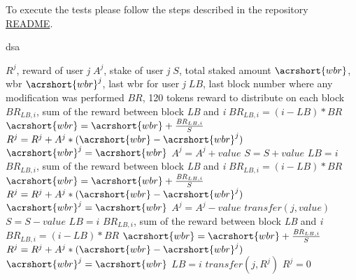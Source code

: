\documentclass[a4paper]{article}
\begin{document}
\noindent To execute the tests please follow the steps described in the repository \href{https://github.com/RideSolo/staking-library/blob/master/README.md}{README}.

\begin{algorithm}[H]
\caption{\acrlong{dsa}}
\label{alg:algo_1}
\begin{algorithmic}
\Variables
	\State $R^j$, reward of user \textit{j}
	\State $A^j$, stake of user \textit{j}
	\State $S$, total staked amount
	\State $\acrshort{wbr}$, \acrlong{wbr}
	\State $\acrshort{wbr}^j$, last \acrlong{wbr} for user \textit{j}
	\State $\mathit{LB}$, last block number where any modification was performed
	\State $\mathit{BR}$, 120 tokens reward to distribute on each block
\EndVariables
{}
  \State $\mathit{BR}_{LB,i}$, sum of the reward between block \textit{LB} and \textit{i}
  \State $\mathit{BR}_{LB,i} = (i - \mathit{LB}) * BR$
    \State $\acrshort{wbr} = \acrshort{wbr} + \frac{\mathit{BR}_{LB,i}}{S}$
  \EndIf
  \State $R^j = R^j + A^j * (\acrshort{wbr} - \acrshort{wbr}^j)$
  \State $\acrshort{wbr}^j = \acrshort{wbr}$
  \State $A^j = A^j + \mathit{value}$
  \State $S = S + \mathit{value}$
  \State $\mathit{LB} = i$
\EndProcedure
{}
  \State $\mathit{BR}_{LB,i}$, sum of the reward between block \textit{LB} and \textit{i}
  \State $\mathit{BR}_{LB,i} = (i - \mathit{LB}) * BR$
    \State $\acrshort{wbr} = \acrshort{wbr} + \frac{\mathit{BR}_{LB,i}}{S}$
  \EndIf
  \State $R^j = R^j + A^j * (\acrshort{wbr} - \acrshort{wbr}^j)$
  \State $\acrshort{wbr}^j = \acrshort{wbr}$
  \State $A^j = A^j - \mathit{value}$
  \State $\mathit{transfer}(j,value)$
  \State $S = S - \mathit{value}$
  \State $\mathit{LB} = i$
\EndProcedure
{}
  \State $\mathit{BR}_{LB,i}$, sum of the reward between block \textit{LB} and \textit{i}
  \State $\mathit{BR}_{LB,i} = (i - \mathit{LB}) * BR$
    \State $\acrshort{wbr} = \acrshort{wbr} + \frac{\mathit{BR}_{LB,i}}{S}$
  \EndIf
  \State $R^j = R^j + A^j * (\acrshort{wbr} - \acrshort{wbr}^j)$
  \State $\acrshort{wbr}^j = \acrshort{wbr}$
  \State $\mathit{LB} = i$
	\State $\mathit{transfer}(j,R^j)$
	\State $R^j = 0$
\EndProcedure
\end{algorithmic}
\end{algorithm}
\clearpage
\end{document}
